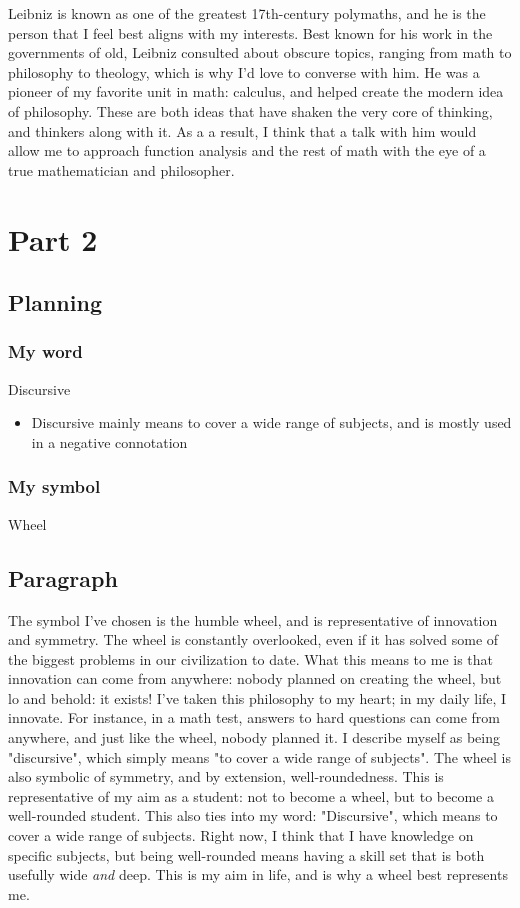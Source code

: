 \documentclass[]{article}
\begin{document}
Leibniz is known as one of the greatest 17th-century polymaths, and he is the person that I feel best aligns with my interests. Best known for his work in the governments of old, Leibniz consulted about obscure topics, ranging from math to philosophy to theology, which is why I'd love to converse with him. 
He was a pioneer of my favorite unit in math: calculus, and helped create the modern idea of philosophy. These are both ideas that have shaken the very core of thinking, and thinkers along with it. As a a result, I think that a talk with him would allow me to approach function analysis and the rest of math with the eye of a true mathematician and philosopher.

\newpage

\section*{Part 2}
\subsection*{Planning}
\subsubsection*{My word}
Discursive
\begin{itemize}
    \item Discursive mainly means to cover a wide range of subjects, and is mostly used in a negative connotation
\end{itemize}
\subsubsection*{My symbol}
Wheel



\newpage

\subsection*{Paragraph}
The symbol I've chosen is the humble wheel, and is representative of innovation and symmetry. The wheel is constantly overlooked, even if it has solved some of the biggest problems in our civilization to date. What this means to me is that innovation can come from anywhere: nobody planned on creating the wheel, but lo and behold: it exists! I've taken this philosophy to my heart; in my daily life, I innovate. For instance, in a math test, answers to hard questions can come from anywhere, and just like the wheel, nobody planned it. I describe myself as being "discursive", which simply means "to cover a wide range of subjects". The wheel is also symbolic of symmetry, and by extension, well-roundedness. This is representative of my aim as a student: not to become a wheel, but to become a well-rounded student. This also ties into my word: "Discursive", which means to cover a wide range of subjects. Right now, I think that I have knowledge on specific subjects, but being well-rounded means having a skill set that is both usefully wide \textit{and} deep. This is my aim in life, and is why a wheel best represents me.
\end{document}
